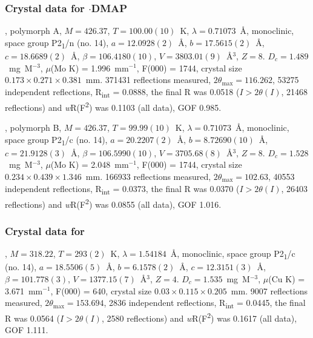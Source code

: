 \begin{refsection}
\subsubsection{Crystal data for \texorpdfstring{$\cdot$DMAP}{C21 H21 N3 O2 Se}}
, polymorph A, $M=426.37$, $T=100.00(10)$~K, $\lambda=0.71073$~\AA, monoclinic, space group P2\textsubscript{1}/n (no. 14), $a = 12.0928(2)$~\AA, $b = 17.5615(2)$~\AA, $c = 18.6689(2)$~\AA, $\beta = 106.4180(10)$\degree, $V = 3803.01(9)$~\AA$^{3}$, $Z = 8$. $D_{c}= 1.489$~mg~M$^{-3}$, $\mu$(Mo K\a) = 1.996~mm$^{-1}$, F(000) = 1744, crystal size $0.173 \times 0.271 \times 0.381$~mm. 371431 reflections measured, $2\theta_{\mathrm{max}}=116.262$\degree, 53275 independent reflections, R\textsubscript{int} = 0.0888, the final R was 0.0518 ($I > 2\theta(I)$, 21468 reflections) and \emph{w}R(F\textsuperscript{2}) was 0.1103 (all data), GOF 0.985.

, polymorph B, $M=426.37$, $T=99.99(10)$~K, $\lambda=0.71073$~\AA, monoclinic, space group P2\textsubscript{1}/c (no. 14), $a = 20.2207(2)$~\AA, $b = 8.72690(10)$~\AA, $c = 21.9128(3)$~\AA, $\beta = 106.5990(10)$\degree, $V = 3705.68(8)$~\AA$^{3}$, $Z = 8$. $D_{c}= 1.528$~mg~M$^{-3}$, $\mu$(Mo K\a) = 2.048~mm$^{-1}$, F(000) = 1744, crystal size $0.234 \times 0.439 \times 1.346$~mm. 166933 reflections measured, $2\theta_{\mathrm{max}}=102.63$\degree, 40553 independent reflections, R\textsubscript{int} = 0.0373, the final R was 0.0370 ($I > 2\theta(I)$, 26403 reflections) and \emph{w}R(F\textsuperscript{2}) was 0.0855 (all data), GOF 1.016.

\subsubsection{Crystal data for \texorpdfstring{}{C15 H13 N O2 Se}}
, $M=318.22$, $T=293(2)$~K, $\lambda=1.54184$~\AA, monoclinic, space group P2\textsubscript{1}/c (no. 14), $a = 18.5506(5)$~\AA, $b = 6.1578(2)$~\AA, $c = 12.3151(3)$~\AA, $\beta = 101.778(3)$\degree, $V = 1377.15(7)$~\AA$^{3}$, $Z = 4$. $D_{c}= 1.535$~mg~M$^{-3}$, $\mu$(Cu K\a) = 3.671~mm$^{-1}$, F(000) = 640, crystal size $0.03 \times 0.115 \times 0.205$~mm. 9007 reflections measured, $2\theta_{\mathrm{max}}=153.694$\degree, 2836 independent reflections, R\textsubscript{int} = 0.0445, the final R was 0.0564 ($I > 2\theta(I)$, 2580 reflections) and \emph{w}R(F\textsuperscript{2}) was 0.1617 (all data), GOF 1.111.


\end{refsection}
